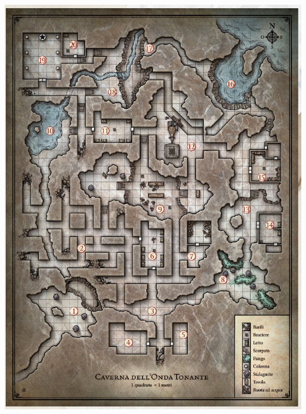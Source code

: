 \documentclass{article}
\begin{document}
\includegraphics{../Mappe/caverna_onda_tonante.png}
\end{document}
